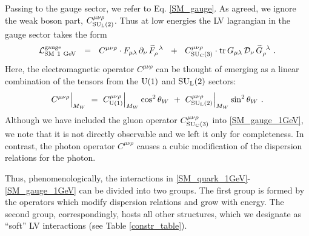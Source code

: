 \documentclass[12pt]{revtex4}
\newcommand{\wt}{\widetilde}
\newcommand{\suc}{{{\rm SU}_{\rm C}(3)}}
\newcommand{\sul}{{{\rm SU}_{\rm L}(2)}}
\newcommand{\ue}{{{\rm U}(1)}}
\begin{document}
	Passing to the gauge sector, we refer to Eq. \eqref{SM_gauge}.
	As agreed, we ignore the weak boson part, $ C_{\sul}^{\mu\nu\rho} $.
	Thus at low energies the LV lagrangian in the gauge sector
	takes the form
\begin{equation}
\label{SM_gauge_1GeV}
	\mathcal{L}_{\rm SM\ 1~GeV}^{\rm gauge} ~~=~~
	C^{\mu\nu\rho} \cdot 
	F_{\mu\lambda}\, \partial_\nu\, \wt{F}_\rho^{\phantom{\rho}\lambda}
	~~+~~
	C_{\suc}^{\mu\nu\rho} \cdot 
	{\rm tr}\,
	G_{\mu\lambda}\, \mathcal{D}_\nu\, \wt{G}_\rho^{\phantom{\rho}\lambda}
	~.
\end{equation}
	Here, the electromagnetic operator
$ C^{\mu\nu\rho} $
	can be thought of emerging as a linear combination of the 
	tensors from the $ \ue $ and $ \sul $ sectors:
\[
	C^{\mu\nu\rho}\Bigr|_{M_W} ~=~ 
		C^{\mu\nu\rho}_{\ue}\Bigr|_{M_W} \cos^2 \theta_W ~+~ 
		C^{\mu\nu\rho}_{\sul}\Bigr|_{M_W} \sin^2 \theta_W~.
\]
	Although we have included the gluon operator $ C_{\suc}^{\mu\nu\rho} $
	into \eqref{SM_gauge_1GeV}, we note 
	that it is not directly observable and we left it only for completeness.
	In contrast, the photon operator $ C^{\mu\nu\rho} $ causes a
	cubic modification of the dispersion relations for the photon.


	Thus, phenomenologically, the interactions in \eqref{SM_quark_1GeV}-\eqref{SM_gauge_1GeV} 
	can be divided into two groups.
	The first group is formed by the operators which modify dispersion relations
	and grow with energy. 
	The second group, correspondingly, hosts all other
	structures, which we designate as ``soft'' LV interactions  
	(see Table \ref{constr_table}).
\end{document}
